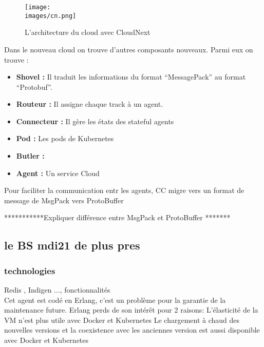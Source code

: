         \begin{figure}[h!]
            \centering
            \texttt{[image: \\images/cn.png]}
            \caption{L'architecture du cloud avec CloudNext}
            \label{fig:cn}
        \end{figure}

        \vspace{0.2cm}

        Dans le nouveau cloud on trouve d'autres composants nouveaux. 
        Parmi eux on trouve : \\[0.3cm]
        \begin{itemize}
            \renewcommand{\labelitemi}{$\bullet$}
                \item \textbf{Shovel :} Il traduit les informations du format “MessagePack” au format “Protobuf”.\\
                \item \textbf{Routeur :} Il assigne chaque track à un agent.\\
                \item \textbf{Connecteur :} Il gère les états des stateful agents\\ 
                \item \textbf{Pod :} Les pods de Kubernetes\\
                \item \textbf{Butler :} \\
                \item \textbf{Agent :} Un service Cloud \\
            \end{itemize} 

            Pour faciliter la communication entr les agents, \gls{CC} migre vers un format de message de MsgPack  vers ProtoBuffer 

            \vspace{0.2cm}

***********Expliquer différence entre MsgPack et ProtoBuffer *******
        \break

    \subsection{le BS \gls{mdi21} de plus pres}

        \subsubsection{technologies}
        Redis , Indigen ..., fonctionnalités \\
        Cet agent est codé en Erlang, c’est un problème pour la garantie de la maintenance future.
        Erlang perds de son intérêt pour 2 raisons:
            L'élasticité de la VM n’est plus utile avec Docker et Kubernetes
            Le chargement à chaud des nouvelles versions et la coexistence avec les anciennes version est aussi 
            disponible avec Docker et Kubernetes

